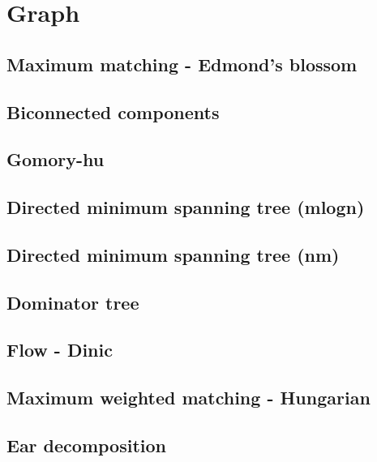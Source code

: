 \section{Graph}
\subsection{Maximum matching - Edmond's blossom}
\raggedbottom
\hrulefill
\subsection{Biconnected components}
\raggedbottom
\hrulefill
\subsection{Gomory-hu}
\raggedbottom
\hrulefill
\subsection{Directed minimum spanning tree (mlogn)}
\raggedbottom
\hrulefill
\subsection{Directed minimum spanning tree (nm)}
\raggedbottom
\hrulefill
\subsection{Dominator tree}
\raggedbottom
\hrulefill
\subsection{Flow - Dinic}
\raggedbottom
\hrulefill
\subsection{Maximum weighted matching - Hungarian}
\raggedbottom
\hrulefill
\subsection{Ear decomposition}
\raggedbottom
\hrulefill


